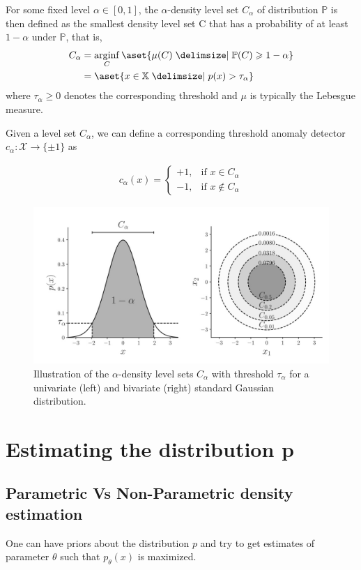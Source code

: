 \documentclass[11pt]{report}
\begin{document}
For some fixed level $\alpha \in [0, 1]$, the $\alpha$-density level set $C_\alpha$ of
distribution $\mathbb{P}$ is then defined as the smallest density level
set C that has a probability of at least $1 - \alpha$ under $\mathbb{P}$, that is,
\begin{align}
    C_\alpha &= \mathop{\arg\!\inf}_{C} \aset{\mu(C) \suchthat \mathbb{P}(C) \geq 1 - \alpha} \nonumber\\
     &= \aset{x \in \mathbb{X} \suchthat p(x) > \tau_\alpha}
\end{align}
where $\tau_\alpha \geq 0$ denotes the corresponding threshold and
$\mu$ is typically the Lebesgue measure.

Given a level set \( C_\alpha \), we can define a corresponding
threshold anomaly detector \( c_\alpha : \mathcal{X} \rightarrow \{ \pm 1 \} \) as

\begin{align}
    c_\alpha(x) =
    \begin{cases}
    +1, & \text{if } x \in C_\alpha \\
    -1, & \text{if } x \notin C_\alpha
    \end{cases}
\end{align}
\begin{figure}
    \centering
    \includegraphics[width=0.5\linewidth]{images/levelset.jpeg}
    \caption{Illustration of the $\alpha$-density level sets $C_\alpha$ with threshold
$\tau_\alpha$ for a univariate (left) and bivariate (right) standard Gaussian
distribution. \cite{ruff2020unifying}}
    \label{fig:placeholder}
\end{figure}

\section{Estimating the distribution p}
\subsection{Parametric Vs Non-Parametric density estimation} One can have priors about the distribution $p$ and try to get estimates of parameter $\theta$ such that $p_\theta(x)$ is maximized.
\end{document}

